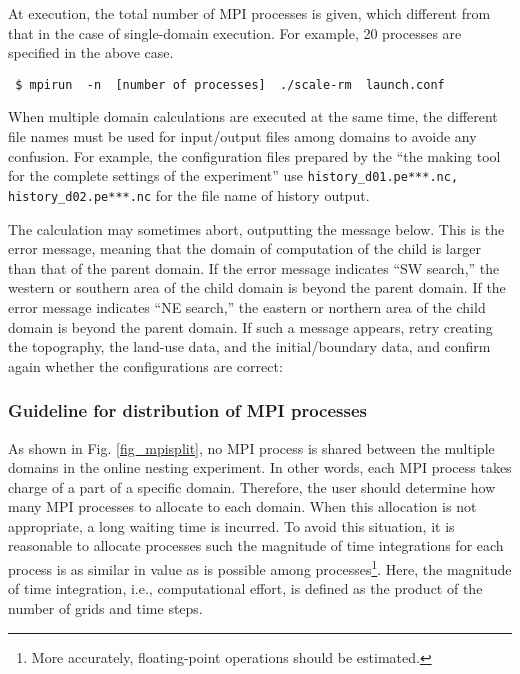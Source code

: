 At execution, the total number of MPI processes is given, which different from that in the case of single-domain execution. For example, 20 processes are specified in the above case.
\begin{verbatim}
 $ mpirun  -n  [number of processes]  ./scale-rm  launch.conf
\end{verbatim}

When multiple domain calculations are executed at the same time,
the different file names must be used for input/output files
among domains to avoide any confusion.
For example, the configuration files prepared by the 
``the making tool for the complete settings of the experiment''
use \verb|history_d01.pe***.nc, history_d02.pe***.nc| for the file name of history output.

The calculation may sometimes abort, outputting the message below. This is the error message, meaning that the domain of computation of the child  is larger than that of the parent domain. If the error message indicates ``SW search,'' the western or southern area of the child domain is beyond the parent domain. If the error message indicates ``NE search,'' the eastern or northern area of the child domain is beyond the parent domain. If such a message appears, retry creating the topography, the land-use data, and the initial/boundary data, and confirm again whether the configurations are correct:


\subsubsection{Guideline for distribution of MPI processes}

As shown in Fig. \ref{fig_mpisplit}, no MPI process is shared between the multiple domains in the online nesting experiment. In other words, each MPI process takes charge of a part of a specific domain. Therefore, the user should determine how many MPI processes to allocate to each domain. When this allocation is not appropriate, a long waiting time is incurred. To avoid this situation, it is reasonable to allocate processes such the magnitude of time integrations for each process is as similar in value as is possible among processes\footnote{More accurately, floating-point operations should be estimated.}. Here, the magnitude of time integration, i.e., computational effort, is defined as the product of the number of grids and time steps.

